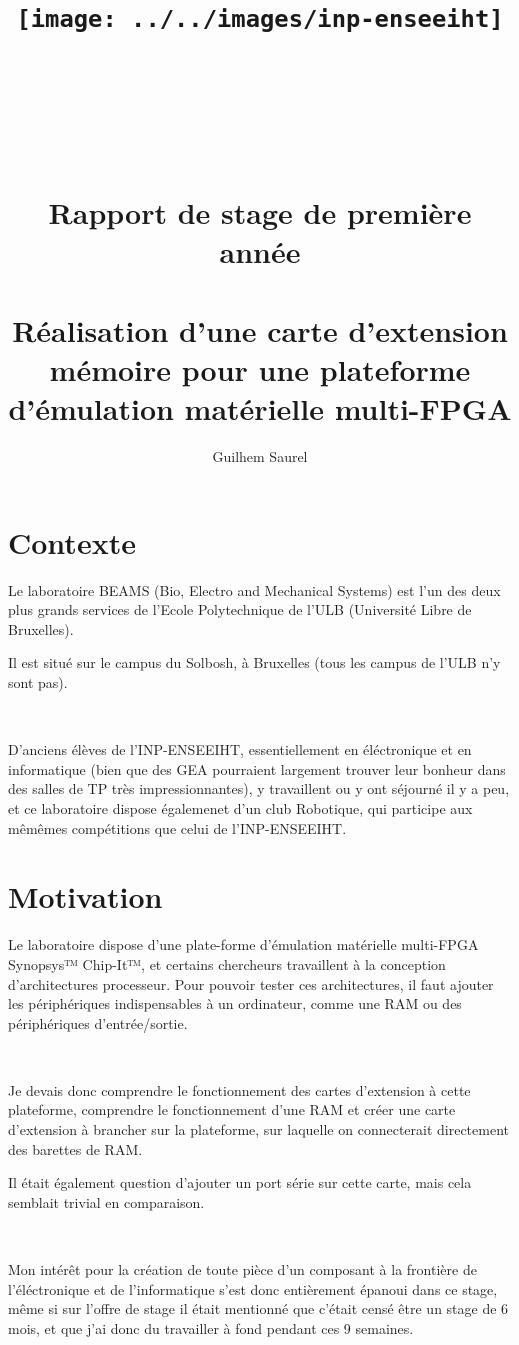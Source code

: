 \documentclass{article}
\title{\texttt{[image: ../../images/inp-enseeiht]} \\ ~ \\ ~ \\ ~ \\ ~ \\ Rapport de stage de première année \\ ~ \\ Réalisation d'une carte d'extension mémoire pour une plateforme d'émulation matérielle multi-FPGA}
\author{Guilhem Saurel}
\date{\oldstylenums{\today}}
\begin{document}
    \maketitle



\section{Contexte}
Le laboratoire BEAMS (Bio, Electro and Mechanical Systems) est l'un des deux plus grands services de l'Ecole Polytechnique de l'ULB (Université Libre de Bruxelles).

Il est situé sur le campus du Solbosh, à Bruxelles (tous les campus de l’ULB n’y sont pas).

~

D’anciens élèves de l’INP-ENSEEIHT, essentiellement en éléctronique et en informatique (bien que des GEA pourraient largement trouver leur bonheur dans des salles de TP très impressionnantes), y travaillent ou y ont séjourné il y a peu, et ce laboratoire dispose égalemenet d’un club Robotique, qui participe aux mêmêmes compétitions que celui de l’INP-ENSEEIHT.

\section{Motivation}
Le laboratoire dispose d’une plate-forme d’émulation matérielle multi-FPGA Synopsys™ Chip-It™, et certains chercheurs travaillent à la conception d’architectures processeur.
Pour pouvoir tester ces architectures, il faut ajouter les périphériques indispensables à un ordinateur, comme une RAM ou des périphériques d’entrée/sortie.

~

Je devais donc comprendre le fonctionnement des cartes d’extension à cette plateforme, comprendre le fonctionnement d’une RAM et créer une carte d’extension à brancher sur la plateforme, sur laquelle on connecterait directement des barettes de RAM.

Il était également question d’ajouter un port série sur cette carte, mais cela semblait trivial en comparaison.

~

Mon intérêt pour la création de toute pièce d’un composant à la frontière de l’éléctronique et de l’informatique s’est donc entièrement épanoui dans ce stage, même si sur l’offre de stage il était mentionné que c’était censé être un stage de 6 mois, et que j’ai donc du travailler à fond pendant ces 9 semaines.
\end{document}
